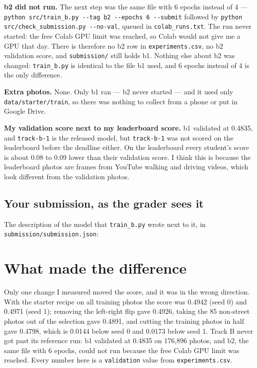 \documentclass[11pt]{article}
\begin{document}
\textbf{b2 did not run.} The next step was the same file with 6 epochs instead
of 4 --- \texttt{python src/train\_b.py -{}-tag b2 -{}-epochs 6 -{}-submit} followed
by \texttt{python src/check\_submission.py -{}-no-val}, queued in
\texttt{colab\_runs.txt}. The run never started: the free Colab GPU limit was
reached, so Colab would not give me a GPU that day. There is therefore no b2 row
in \texttt{experiments.csv}, no b2 validation score, and \texttt{submission/}
still holds b1. Nothing else about b2 was changed: \texttt{train\_b.py} is
identical to the file b1 used, and 6 epochs instead of 4 is the only difference.

\textbf{Extra photos.} None. Only b1 ran --- b2 never started --- and it used
only \texttt{data/starter/train}, so there was nothing to collect from a phone
or put in Google Drive.

\textbf{My validation score next to my leaderboard score.} b1 validated at
0.4835, and \texttt{track-b-1} is the released model, but \texttt{track-b-1} was
not scored on the leaderboard before the deadline either. On the leaderboard
every student's score is about 0.08 to 0.09 lower than their validation score. I
think this is because the leaderboard photos are frames from YouTube walking and
driving videos, which look different from the validation photos.

\subsection*{Your submission, as the grader sees it}

The description of the model that \texttt{train\_b.py} wrote next to it, in
\texttt{submission/submission.json}:


\section*{What made the difference}

Only one change I measured moved the score, and it was in the wrong direction.
With the starter recipe on all training photos the score was 0.4942 (seed 0) and
0.4971 (seed 1); removing the left-right flip gave 0.4926, taking the 85
non-street photos out of the selection gave 0.4891, and cutting the training
photos in half gave 0.4798, which is 0.0144 below seed 0 and 0.0173 below seed 1.
Track B never got past its reference run: b1 validated at 0.4835 on 176,896
photos, and b2, the same file with 6 epochs, could not run because the free
Colab GPU limit was reached. Every number here is a \texttt{validation} value
from \texttt{experiments.csv}.
\end{document}
